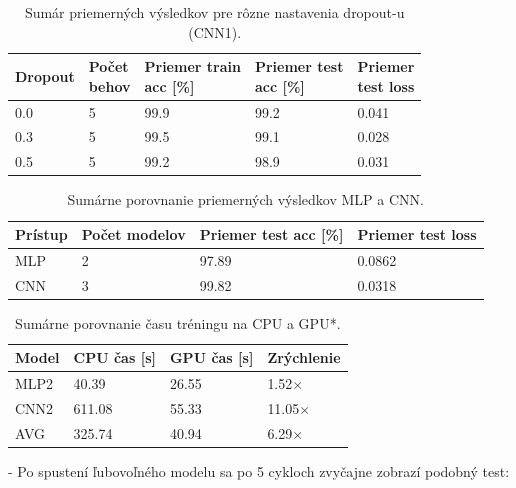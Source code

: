 \documentclass[12pt, a4paper]{article}
\begin{document}
\begin{table}[htbp]
\centering
\caption{Sumár priemerných výsledkov pre rôzne nastavenia dropout-u (CNN1).}
\label{tab:dropout_summary}
\begin{tabular}{lllll}
\toprule
Dropout & \shortstack{Počet\\behov} & \shortstack{Priemer train\\acc [\%]} & \shortstack{Priemer test\\acc [\%]} & \shortstack{Priemer\\test loss} \\
\midrule
0.0 & 5 & 99.9 & 99.2 & 0.041 \\
0.3 & 5 & 99.5 & 99.1 & 0.028 \\
0.5 & 5 & 99.2 & 98.9 & 0.031 \\
\bottomrule
\end{tabular}
\end{table}

\begin{table}[htbp]
\centering
\caption{Sumárne porovnanie priemerných výsledkov MLP a CNN.}
\label{tab:mlp_cnn_summary}
\begin{tabular}{llll}
\toprule
Prístup & Počet modelov & Priemer test acc [\%] & Priemer test loss \\
\midrule
MLP & 2 & 97.89 & 0.0862 \\
CNN & 3 & 99.82 & 0.0318 \\
\bottomrule
\end{tabular}
\end{table}
\begin{table}
\centering
\caption{Sumárne porovnanie času tréningu na CPU a GPU*.}
\label{tab:cpu_gpu_summary}
\begin{tabular}{llll}
\toprule
Model & CPU čas [s] & GPU čas [s] & Zrýchlenie \\
\midrule
MLP2 & 40.39 & 26.55 & 1.52$\times$ \\
CNN2 & 611.08 & 55.33 & 11.05$\times$ \\
AVG & 325.74 & 40.94 & 6.29$\times$ \\
\bottomrule
\end{tabular}
\end{table}

\newpage
-
\newpage
Po spustení ľubovoľného modelu sa po 5 cykloch zvyčajne zobrazí podobný test:
\end{document}
